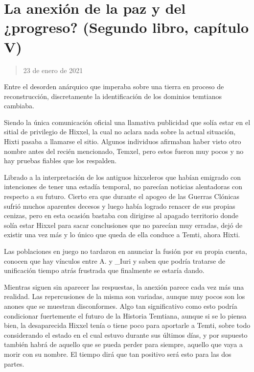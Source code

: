 \documentclass[
]{book}
\begin{document}
\hypertarget{la-anexiuxf3n-de-la-paz-y-del-progreso-segundo-libro-capuxedtulo-v}{%
\section{La anexión de la paz y del ¿progreso? (Segundo libro, capítulo V)}\label{la-anexiuxf3n-de-la-paz-y-del-progreso-segundo-libro-capuxedtulo-v}}

\begin{quote}
23 de enero de 2021
\end{quote}

Entre el desorden anárquico que imperaba sobre una tierra en proceso de reconstrucción, discretamente la identificación de los dominios temtianos cambiaba.

Siendo la única comunicación oficial una llamativa publicidad que solía estar en el sitial de privilegio de Hixxel, la cual no aclara nada sobre la actual situación, Hixti pasaba a llamarse el sitio. Algunos individuos afirmaban haber visto otro nombre antes del recién mencionado, Temxel, pero estos fueron muy pocos y no hay pruebas fiables que los respalden.

Librado a la interpretación de los antiguos hixxeleros que habían emigrado con intenciones de tener una estadía temporal, no parecían noticias alentadoras con respecto a su futuro. Cierto era que durante el apogeo de las Guerras Clónicas sufrió muchos aparentes decesos y luego había logrado renacer de sus propias cenizas, pero en esta ocasión bastaba con dirigirse al apagado territorio donde solía estar Hixxel para sacar conclusiones que no parecían muy erradas, dejó de existir una vez más y lo único que queda de ella conduce a Temti, ahora Hixti.

Las poblaciones en juego no tardaron en anunciar la fusión por su propia cuenta, conocen que hay vínculos entre A. y \_Iuri y saben que podría tratarse de unificación tiempo atrás frustrada que finalmente se estaría dando.

Mientras siguen sin aparecer las respuestas, la anexión parece cada vez más una realidad. Las repercusiones de la misma son variadas, aunque muy pocos son los anones que se muestran disconformes. Algo tan significativo como esto podría condicionar fuertemente el futuro de la Historia Temtiana, aunque si se lo piensa bien, la desaparecida Hixxel tenía o tiene poco para aportarle a Temti, sobre todo considerando el estado en el cual estuvo durante sus últimos días, y por supuesto también habrá de aquello que se pueda perder para siempre, aquello que vaya a morir con su nombre. El tiempo dirá que tan positivo será esto para las dos partes.
\end{document}
